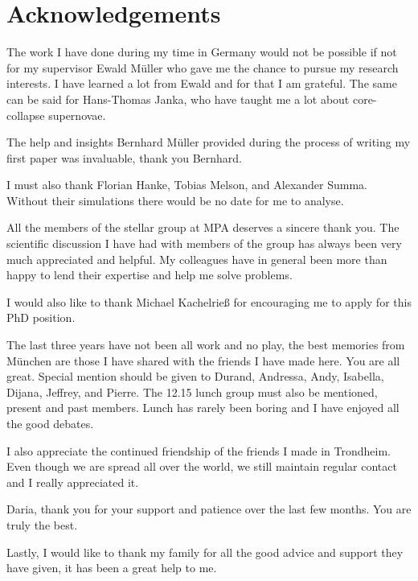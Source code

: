 \chapter{Acknowledgements}
The work I have done during my time in Germany would not be possible if not for
my supervisor Ewald M\"uller who gave me the chance to pursue my research interests.
I have learned a lot from Ewald and for that I am grateful. The same can be said for 
Hans-Thomas Janka, who have taught me a lot about core-collapse supernovae.

The help and insights Bernhard M\"uller provided during the process of writing my first paper was invaluable, thank you Bernhard.  

I must also thank Florian Hanke, Tobias Melson, and Alexander Summa. Without their
simulations there would be no date for me to analyse. 

All the members of the stellar group at MPA deserves a sincere thank you. 
The scientific discussion I have had with members of the group has always been
very much appreciated and helpful. My colleagues have in general been more than happy
to lend their expertise and help me solve problems.  

I would also like to thank Michael Kachelrie{\ss} for encouraging me to apply for this PhD position.

The last three years have not been all work and no play, the best memories from M\"unchen 
are those I have shared with the friends I have made here. You are all great. Special mention
should be given to Durand, Andressa, Andy, Isabella, Dijana, Jeffrey, and Pierre. 
The 12.15 lunch group must also be mentioned, present and past members. Lunch has rarely been boring
and I have enjoyed all the good debates.

I also appreciate the continued friendship of the friends I made in Trondheim. Even though we 
are spread all over the world, we still maintain regular contact and I really appreciated it.

Daria, thank you for your support and patience over the last few months. You are truly the best.

Lastly, I would like to thank my family for all the good advice and support they have given,
it has been a great help to me.  
